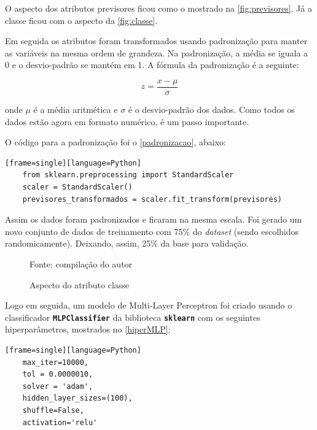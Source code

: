 O aspecto dos atributos previsores ficou como o mostrado na \autoref{fig:previsores}. Já a classe ficou com o aspecto da \autoref{fig:classe}.

Em seguida os atributos foram transformados usando padronização para manter as variáveis na mesma ordem de grandeza. Na padronização, a média se iguala a 0 e o desvio-padrão se mantém em 1. A fórmula da padronização é a seguinte:

\begin{equation}\label{eq:padronizacao}
z = \frac{x - \mu}{\sigma}
\end{equation}

onde $\mu$ é a média aritmética e $\sigma$ é o desvio-padrão dos dados. Como todos os dados estão agora em formato numérico, é um passo importante. 

O código para a padronização foi o \autoref{padronizacao}, abaixo:
\begin{lstlisting}[caption={Código da Padronização},label=padronizacao][frame=single][language=Python]
	from sklearn.preprocessing import StandardScaler
	scaler = StandardScaler()
	previsores_transformados = scaler.fit_transform(previsores)
\end{lstlisting}

Assim os dados foram padronizados e ficaram na mesma escala. Foi gerado um novo conjunto de dados de treinamento com 75\% do \textit{dataset} (sendo escolhidos randomicamente). Deixando, assim, 25\% da base para validação.

\begin{figure}[H]
	\centering
	\caption{Aspecto do atributo classe}
	
	\label{fig:classe}
	{\scriptsize Fonte: compilação do autor}
\end{figure}

Logo em seguida, um modelo de Multi-Layer Perceptron foi criado usando o classificador \texttt{\textbf{MLPClassifier}} da biblioteca \texttt{\textbf{sklearn}} com os seguintes hiperparâmetros, mostrados no \autoref{hiperMLP}: 
\begin{lstlisting}[caption={Hiperparâmetros do MLPClassifier},label=hiperMLP][frame=single][language=Python]
	max_iter=10000,
	tol = 0.0000010,
	solver = 'adam',
	hidden_layer_sizes=(100),
	shuffle=False,
	activation='relu'
\end{lstlisting}

